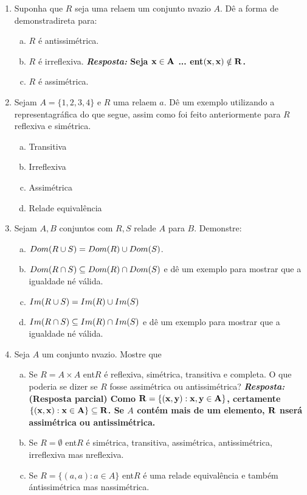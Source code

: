 \begin{enumerate}[{\bf 1.}]
\item Suponha que $R$ seja uma rela\cao em um conjunto n\ao vazio $A$. D\^e a forma de demonstra\cao direta para:
\begin{enumerate}[a)]
\item $R$ \'e antissim\'etrica.
\item $R$ \'e irreflexiva. {\bf{\it Resposta:} Seja ${\bf x\in A}$ ... ent\ao ${\bf (x,x)\notin R}$.}
\item $R$ \'e assim\'etrica.
\end{enumerate}

\item Sejam $A=\{1,2,3,4\}$ e $R$ uma rela\cao em $a$. D\^e um exemplo utilizando a representa\cao gr\'afica do que segue, assim como foi feito anteriormente para $R$ reflexiva e sim\'etrica.
\begin{enumerate}[a)]
\item Transitiva
\item Irreflexiva
\item Assim\'etrica
\item Rela\cao de equival\^encia
\end{enumerate}

\item Sejam $A,B$ conjuntos com $R,S$ rela\coes de $A$ para $B$. Demonstre:
\begin{enumerate}[a)]
\item $Dom(R\cup S)=Dom(R)\cup Dom(S)$.
\item $Dom(R\cap S)\subseteq Dom(R)\cap Dom(S)$ e d\^e um exemplo para mostrar que a igualdade n\ao \'e v\'alida.
\item $Im(R\cup S)=Im(R)\cup Im(S)$
\item $Im(R\cap S)\subseteq Im(R)\cap Im(S)$ e d\^e um exemplo para mostrar que a igualdade n\ao \'e v\'alida.
\end{enumerate}

\item Seja $A$ um conjunto n\ao vazio. Mostre que
\begin{enumerate}[a)]
\item Se $R=A\times A$ ent\ao $R$ \'e reflexiva, sim\'etrica, transitiva e completa. O que poderia se dizer se $R$ fosse assim\'etrica ou antissim\'etrica?  {\bf{\it Resposta:} (Resposta parcial) Como  ${\bf R=\{(x,y): x,y\in A\}}$, certamente ${\bf \{(x,x): x\in A\}\subseteq R}$. Se $A$ cont\'em mais de um elemento, ${\bf R}$ n\ao ser\'a assim\'etrica ou antissim\'etrica.}
\item Se $R=\emptyset$ ent\ao $R$ \'e sim\'etrica, transitiva, assim\'etrica, antissim\'etrica, irreflexiva mas n\ao reflexiva.
\item Se $R=\{(a,a):a\in A\}$ ent\ao $R$ \'e uma rela\cao de equival\^encia e tamb\'em \' antissim\'etrica mas n\ao assim\'etrica.
\end{enumerate}


\end{enumerate}
